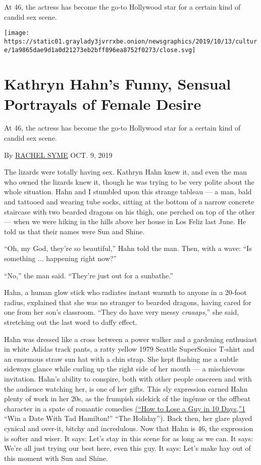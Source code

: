 At 46, the actress has become the go-to Hollywood star for a certain
kind of candid sex scene.

\texttt{[image: https://static01.graylady3jvrrxbe.onion/newsgraphics/2019/10/13/culture/1a9865dae9d1a0d21273eb2bff896ea8752f0273/close.svg]}

\hypertarget{kathryn-hahns-funny-sensual-portrayals-of-female-desire-1}{%
\section{Kathryn Hahn's Funny, Sensual Portrayals of Female
Desire}\label{kathryn-hahns-funny-sensual-portrayals-of-female-desire-1}}

At 46, the actress has become the go-to Hollywood star for a certain
kind of candid sex scene.

By \href{https://www.nytimes3xbfgragh.onion/by/rachel-syme}{RACHEL SYME}
OCT. 9, 2019

The lizards were totally having sex. Kathryn Hahn knew it, and even the
man who owned the lizards knew it, though he was trying to be very
polite about the whole situation. Hahn and I stumbled upon this strange
tableau --- a man, bald and tattooed and wearing tube socks, sitting at
the bottom of a narrow concrete staircase with two bearded dragons on
his thigh, one perched on top of the other --- when we were hiking in
the hills above her house in Los Feliz last June. He told us that their
names were Sun and Shine.

``Oh, my God, they're so beautiful,'' Hahn told the man. Then, with a
wave: ``Is something ... happening right now?''

``No,'' the man said. ``They're just out for a sunbathe.''

Hahn, a human glow stick who radiates instant warmth to anyone in a
20-foot radius, explained that she was no stranger to bearded dragons,
having cared for one from her son's classroom. ``They do have very messy
\emph{craaaps},'' she said, stretching out the last word to daffy
effect.

Hahn was dressed like a cross between a power walker and a gardening
enthusiast in white Adidas track pants, a ratty yellow 1979 Seattle
SuperSonics T-shirt and an enormous straw sun hat with a chin strap. She
kept flashing me a subtle sideways glance while curling up the right
side of her mouth --- a mischievous invitation. Hahn's ability to
conspire, both with other people onscreen and with the audience watching
her, is one of her gifts. This sly expression earned Hahn plenty of work
in her 20s, as the frumpish sidekick of the ingénue or the offbeat
character in a spate of romantic comedies
\href{http://nytimes3xbfgragh.onion\#tooltip-1}{(``How to Lose a Guy in
10 Days,''1} ``Win a Date With Tad Hamilton!'' ``The Holiday''). Back
then, her glare played cynical and over-it, bitchy and incredulous. Now
that Hahn is 46, the expression is softer and wiser. It says: Let's stay
in this scene for as long as we can. It says: We're all just trying our
best here, even this guy. It says: Let's make hay out of this moment
with Sun and Shine.

